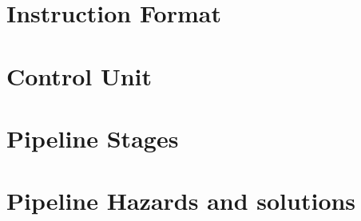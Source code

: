 \documentclass[12pt]{report}
\begin{document}
\part{Instruction Format}

\part{Control Unit}

\part{Pipeline Stages}

\part{Pipeline Hazards and solutions}
\end{document}
